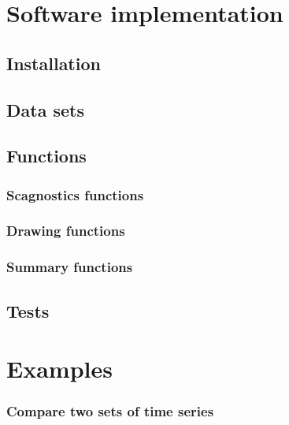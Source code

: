 \hypertarget{software-implementation}{%
\section{Software implementation}\label{software-implementation}}

\hypertarget{installation}{%
\subsection{Installation}\label{installation}}

\hypertarget{data-sets}{%
\subsection{Data sets}\label{data-sets}}

\hypertarget{functions}{%
\subsection{Functions}\label{functions}}

\hypertarget{scagnostics-functions}{%
\subsubsection{Scagnostics functions}\label{scagnostics-functions}}

\hypertarget{drawing-functions}{%
\subsubsection{Drawing functions}\label{drawing-functions}}

\hypertarget{summary-functions}{%
\subsubsection{Summary functions}\label{summary-functions}}

\hypertarget{tests}{%
\subsection{Tests}\label{tests}}

\hypertarget{examples}{%
\section{Examples}\label{examples}}

\hypertarget{compare-two-sets-of-time-series}{%
\subsubsection{Compare two sets of time
series}\label{compare-two-sets-of-time-series}}


